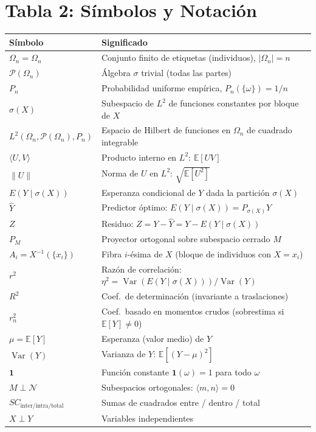 \documentclass[11pt]{article}
\newcommand{\E}{\mathbb{E}}
\newcommand{\Var}{\operatorname{Var}}
\newcommand{\Om}{\Omega_n}
\newcommand{\sg}{\sigma}
\begin{document}
\section*{Tabla 2: Símbolos y Notación}
\vspace{0.3em}
\begin{center}
\small
\begin{tabular}{@{}p{2.8cm}p{9.2cm}@{}}
\toprule
\textbf{Símbolo} & \textbf{Significado}\\
\midrule
$\Om=\Omega_n$ & Conjunto finito de etiquetas (individuos), $|\Om|=n$\\
$\mathcal P(\Om)$ & Álgebra $\sigma$ trivial (todas las partes)\\
$P_n$ & Probabilidad uniforme empírica, $P_n(\{\omega\})=1/n$\\
$\sg(X)$ & Subespacio de $L^2$ de funciones constantes por bloque de $X$\\
$L^2(\Om,\mathcal P(\Om),P_n)$ & Espacio de Hilbert de funciones en $\Om$ de cuadrado integrable\\
$\langle U,V\rangle$ & Producto interno en $L^2$: $\E[UV]$\\
$\|U\|$ & Norma de $U$ en $L^2$: $\sqrt{\E[U^2]}$\\
$E(Y\mid\sg(X))$ & Esperanza condicional de $Y$ dada la partición $\sg(X)$\\
$\hat Y$ & Predictor óptimo: $E(Y\mid\sg(X))=P_{\sg(X)}Y$\\
$Z$ & Residuo: $Z=Y-\hat Y=Y-E(Y\mid\sg(X))$\\
$P_M$ & Proyector ortogonal sobre subespacio cerrado $M$\\
$A_i=X^{-1}(\{x_i\})$ & Fibra $i$-ésima de $X$ (bloque de individuos con $X=x_i$)\\
$r^2$ & Razón de correlación: $\eta^2=\Var(E(Y\mid\sg(X)))/\Var(Y)$\\
$R^2$ & Coef.\ de determinación (invariante a traslaciones)\\
$r_n^2$ & Coef.\ basado en momentos crudos (sobrestima si $\E[Y]\neq0$)\\
$\mu=\E[Y]$ & Esperanza (valor medio) de $Y$\\
$\Var(Y)$ & Varianza de $Y$: $\E[(Y-\mu)^2]$\\
$\mathbf 1$ & Función constante $\mathbf 1(\omega)=1$ para todo $\omega$\\
$M\perp\mathcal N$ & Subespacios ortogonales: $\langle m,n\rangle=0$\\
$SC_\text{inter/intra/total}$ & Sumas de cuadrados entre / dentro / total\\
$X\perp Y$ & Variables independientes\\
\bottomrule
\end{tabular}
\end{center}
\end{document}
